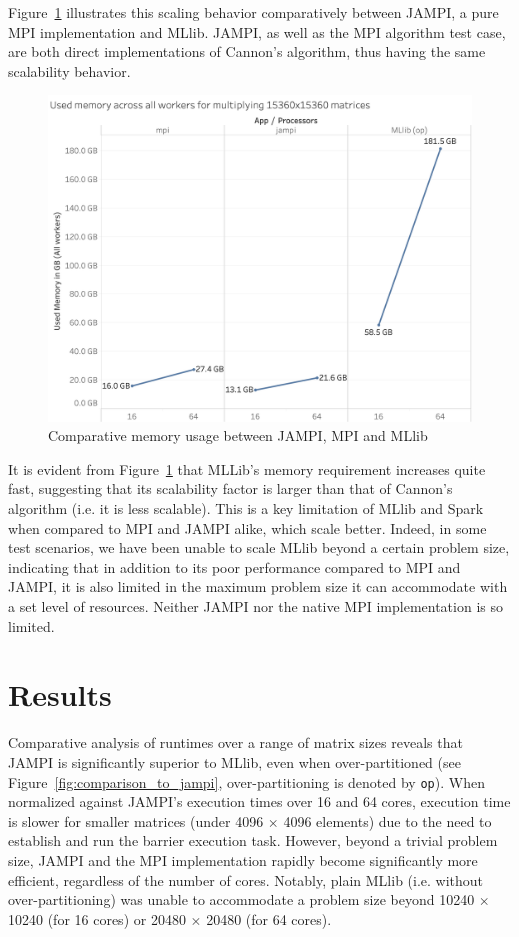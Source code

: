 \documentclass[bdcc,article,submit,moreauthors,pdftex]{Definitions/mdpi}
\begin{document}
Figure~\ref{fig:memory_usage} illustrates this scaling behavior comparatively between JAMPI, a pure MPI implementation and MLlib. JAMPI, as well as the MPI algorithm test case, are both direct implementations of Cannon's algorithm, thus having the same scalability behavior. 

\begin{figure}
	\centering
	\includegraphics[width=0.9\linewidth]{figures/memory.png}
	\vspace{14pt}
	\caption{Comparative memory usage between JAMPI, MPI and MLlib}
	\label{fig:memory_usage}
\end{figure}

It is evident from Figure~\ref{fig:memory_usage} that MLLib's memory requirement increases quite fast, suggesting that its scalability factor is larger than that of Cannon's algorithm (i.e. it is less scalable). This is a key limitation of MLlib and Spark when compared to MPI and JAMPI alike, which scale better. Indeed, in some test scenarios, we have been unable to scale MLlib beyond a certain problem size, indicating that in addition to its poor performance compared to MPI and JAMPI, it is also limited in the maximum problem size it can accommodate with a set level of resources. Neither JAMPI nor the native MPI implementation is so limited.


\section{Results} %
\label{sec:results}

Comparative analysis of runtimes over a range of matrix sizes reveals that JAMPI is significantly superior to MLlib, even when over-partitioned (see Figure~\ref{fig:comparison_to_jampi}, over-partitioning is denoted by \texttt{op}). When normalized against JAMPI's execution times over 16 and 64 cores, execution time is slower for smaller matrices (under 4096 $\times$ 4096 elements) due to the need to establish and run the barrier execution task. However, beyond a trivial problem size, JAMPI and the MPI implementation rapidly become significantly more efficient, regardless of the number of cores. Notably, plain MLlib (i.e. without over-partitioning) was unable to accommodate a problem size beyond 10240 $\times$ 10240 (for 16 cores) or 20480 $\times$ 20480 (for 64 cores).
\end{document}
